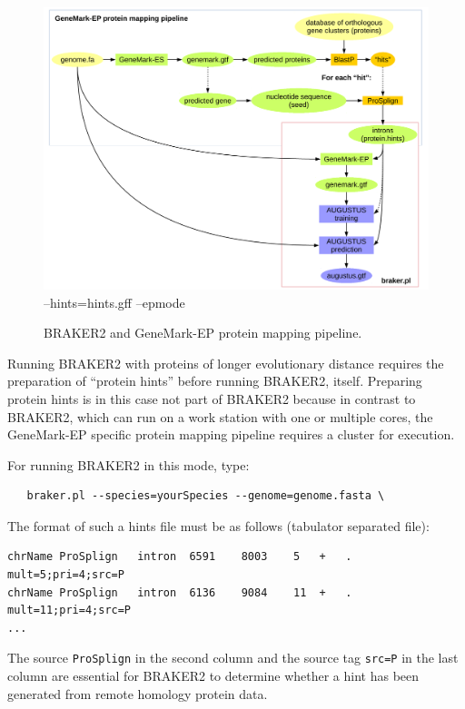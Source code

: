\documentclass[a4paper,10pt]{report}
\begin{document}
\begin{figure}
 \centering
 \includegraphics[scale=0.4]{./figs/gatech-prot-pipeline.pdf}
 --hints=hints.gff --epmode
 \caption{BRAKER2 and GeneMark-EP protein mapping pipeline.}
 \label{gatech}
\end{figure}

Running BRAKER2 with proteins of longer evolutionary distance requires the preparation of ``protein hints'' before running BRAKER2, itself. Preparing protein hints is in this case not part of BRAKER2 because in contrast to BRAKER2, which can run on a work station with one or multiple cores, the GeneMark-EP specific protein mapping pipeline requires a cluster for execution.

For running BRAKER2 in this mode, type:

\begin{verbatim}
   braker.pl --species=yourSpecies --genome=genome.fasta \
\end{verbatim}

The format of such a hints file must be as follows (tabulator separated file):

\begin{verbatim}
chrName	ProSplign	intron	6591	8003	5	+	.	mult=5;pri=4;src=P
chrName	ProSplign	intron	6136	9084	11	+	.	mult=11;pri=4;src=P
...
\end{verbatim}

The source \texttt{ProSplign} in the second column and the source tag \texttt{src=P} in the last column are essential for BRAKER2 to determine whether a hint has been generated from remote homology protein data. 
\end{document}
